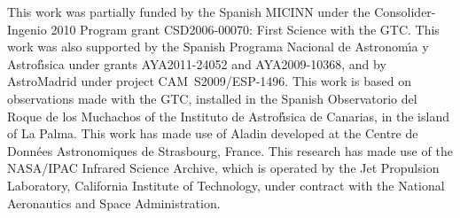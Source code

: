 \acknowledgements This work was partially funded by the Spanish MICINN under the Consolider-Ingenio 2010 Program grant CSD2006-00070: First Science with the GTC. This work was also supported by the Spanish Programa Nacional de Astronom\'{\i}a y Astrof\'{\i}sica under grants AYA2011-24052 and AYA2009-10368, and by AstroMadrid under project CAM~S2009/ESP-1496. This work is based on observations made with the GTC, installed in the Spanish Observatorio del Roque de los Muchachos of the Instituto de Astrof\'{\i}sica de Canarias, in the island of La Palma. This work has made use of Aladin developed at the Centre de Donn\'{e}es Astronomiques de Strasbourg, France. This research has made use of the NASA/IPAC Infrared Science Archive, which is operated by the Jet Propulsion Laboratory, California Institute of Technology, under contract with the National Aeronautics and Space Administration.



